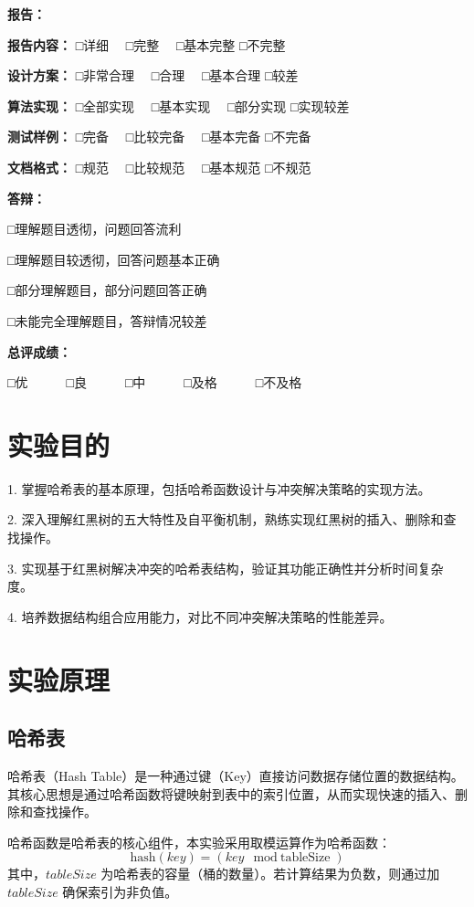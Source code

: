 \documentclass[12pt,a4paper]{article}
\begin{document}
\newpage
\begin{center}
\textbf{报告：}

\textbf{报告内容：} □详细　 □完整　 □基本完整 □不完整

\textbf{设计方案：} □非常合理　 □合理　 □基本合理 □较差

\textbf{算法实现：} □全部实现　 □基本实现　 □部分实现 □实现较差

\textbf{测试样例：} □完备　 □比较完备　 □基本完备 □不完备

\textbf{文档格式：} □规范　 □比较规范　 □基本规范 □不规范

\vspace{1cm}
\textbf{答辩：}

□理解题目透彻，问题回答流利

□理解题目较透彻，回答问题基本正确

□部分理解题目，部分问题回答正确

□未能完全理解题目，答辩情况较差

\vspace{1cm}
\textbf{总评成绩：}

□优　　　□良　　　□中　　　□及格　　　□不及格
\end{center}

\newpage
\section{实验目的}
1. 掌握哈希表的基本原理，包括哈希函数设计与冲突解决策略的实现方法。

2. 深入理解红黑树的五大特性及自平衡机制，熟练实现红黑树的插入、删除和查找操作。

3. 实现基于红黑树解决冲突的哈希表结构，验证其功能正确性并分析时间复杂度。

4. 培养数据结构组合应用能力，对比不同冲突解决策略的性能差异。

\section{实验原理}
\subsection{哈希表}
哈希表（Hash Table）是一种通过键（Key）直接访问数据存储位置的数据结构。其核心思想是通过哈希函数将键映射到表中的索引位置，从而实现快速的插入、删除和查找操作。

哈希函数是哈希表的核心组件，本实验采用取模运算作为哈希函数：
\[
\text{hash}(key) = (key \mod \text{tableSize})
\]
其中，\(tableSize\) 为哈希表的容量（桶的数量）。若计算结果为负数，则通过加 \(tableSize\) 确保索引为非负值。
\end{document}
